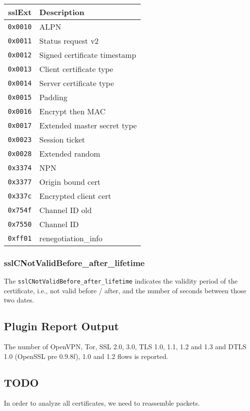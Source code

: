 \documentclass[documentation]{subfiles}
\begin{document}
\begin{minipage}{0.48\textwidth}
    \begin{longtable}{rl}
        \toprule
        {\bf sslExt} & {\bf Description}\\
        \midrule\endhead%
        {\tt 0x0010} & ALPN\\
        {\tt 0x0011} & Status request v2\\
        {\tt 0x0012} & Signed certificate timestamp\\
        {\tt 0x0013} & Client certificate type\\
        {\tt 0x0014} & Server certificate type\\
        {\tt 0x0015} & Padding\\
        {\tt 0x0016} & Encrypt then MAC\\
        {\tt 0x0017} & Extended master secret type\\
        {\tt 0x0023} & Session ticket\\
        {\tt 0x0028} & Extended random\\
        {\tt 0x3374} & NPN\\
        {\tt 0x3377} & Origin bound cert\\
        {\tt 0x337c} & Encrypted client cert\\
        {\tt 0x754f} & Channel ID old\\
        {\tt 0x7550} & Channel ID\\
        {\tt 0xff01} & renegotiation\_info\\
        \bottomrule
    \end{longtable}
\end{minipage}

\subsubsection{sslCNotValidBefore\_after\_lifetime}\label{sslValidity}
The {\tt sslCNotValidBefore\_after\_lifetime} indicates the validity period of the certificate, i.e., not valid before / after, and the number of seconds between those two dates.

\subsection{Plugin Report Output}
The number of OpenVPN, Tor, SSL 2.0, 3.0, TLS 1.0, 1.1, 1.2 and 1.3 and DTLS 1.0 (OpenSSL pre 0.9.8f), 1.0 and 1.2 flows is reported.

\subsection{TODO}
In order to analyze all certificates, we need to reassemble packets.
\end{document}
